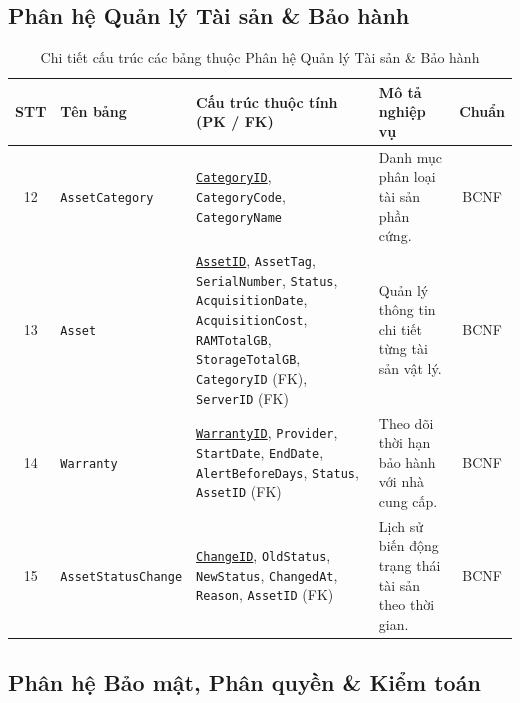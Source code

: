 \subsection{Phân hệ Quản lý Tài sản \& Bảo hành}

\begin{table}[H]
\centering
\caption{Chi tiết cấu trúc các bảng thuộc Phân hệ Quản lý Tài sản \& Bảo hành}
\label{tab:ph_taisan}
\small
\begin{tabularx}{\textwidth}{|c|l|X|X|c|}
\hline
\textbf{STT} & \textbf{Tên bảng} & \textbf{Cấu trúc thuộc tính (PK / FK)} & \textbf{Mô tả nghiệp vụ} & \textbf{Chuẩn} \\ \hline
12 & \texttt{AssetCategory} & \underline{\texttt{CategoryID}}, \texttt{CategoryCode}, \texttt{CategoryName} & Danh mục phân loại tài sản phần cứng. & BCNF \\ \hline
13 & \texttt{Asset} & \underline{\texttt{AssetID}}, \texttt{AssetTag}, \texttt{SerialNumber}, \texttt{Status}, \texttt{AcquisitionDate}, \texttt{AcquisitionCost}, \texttt{RAMTotalGB}, \texttt{StorageTotalGB}, \texttt{CategoryID} (FK), \texttt{ServerID} (FK) & Quản lý thông tin chi tiết từng tài sản vật lý. & BCNF \\ \hline
14 & \texttt{Warranty} & \underline{\texttt{WarrantyID}}, \texttt{Provider}, \texttt{StartDate}, \texttt{EndDate}, \texttt{AlertBeforeDays}, \texttt{Status}, \texttt{AssetID} (FK) & Theo dõi thời hạn bảo hành với nhà cung cấp. & BCNF \\ \hline
15 & \texttt{AssetStatusChange} & \underline{\texttt{ChangeID}}, \texttt{OldStatus}, \texttt{NewStatus}, \texttt{ChangedAt}, \texttt{Reason}, \texttt{AssetID} (FK) & Lịch sử biến động trạng thái tài sản theo thời gian. & BCNF \\ \hline
\end{tabularx}
\end{table}

\subsection{Phân hệ Bảo mật, Phân quyền \& Kiểm toán}

